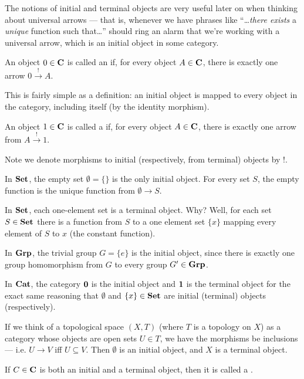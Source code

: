
The notions of initial and terminal objects are very useful later
on when thinking about universal arrows --- that is, whenever we
have phrases like ``\ldots\emph{there exists} a \emph{unique}
function such that\ldots'' should ring an alarm that we're
working with a universal arrow, which is an initial object in
some category.

\begin{defn}%
An object $0\in\mathbf{C}$ is called an  if, for every
object $A\in\mathbf{C}$, there is exactly one arrow $0\xrightarrow{\;\;!\;\;}A$.
\end{defn}

This is fairly simple as a definition: an initial object is
mapped to every object in the category, including itself (by the
identity morphism).

\begin{defn}%
An object $1\in\mathbf{C}$ is called a  if, for every
object $A\in\mathbf{C}$, there is exactly one arrow from $A\xrightarrow{\;\;!\;\;}1$.
\end{defn}

Note we denote morphisms to initial (respectively, from terminal)
objects by $!$.


\begin{ex}
In $\mathbf{Set}$, the empty set $\emptyset=\{\}$ is the only initial
object. For every set $S$, the empty function is the unique
function from $\emptyset\to S$.

In $\mathbf{Set}$, each one-element set is a terminal object. Why?
Well, for each set $S\in\mathbf{Set}$ there is a function from $S$ to
a one element set $\{x\}$ mapping every element of $S$ to $x$
(the constant function).
\end{ex}

\begin{ex}
In $\mathbf{Grp}$, the trivial group $G=\{e\}$ is the initial object,
since there is exactly one group homomorphism from $G$ to every
group $G'\in\mathbf{Grp}$. 
\end{ex}

\begin{ex}
In $\mathbf{Cat}$, the category $\mathbf{0}$ is the initial object and
$\mathbf{1}$ is the terminal object for the exact same reasoning that
$\emptyset$ and $\{x\}\in\mathbf{Set}$ are initial (terminal) objects
(respectively).  
\end{ex}

\begin{ex}
If we think of a topological space $(X,T)$ (where $T$ is a
topology on $X$) as a category whose objects are open sets
$U\in{}T$, we have the morphisms be inclusions --- i.e. $U\to{}V$
iff $U\subseteq{}V$. Then $\emptyset$ is an initial object, and
$X$ is a terminal object.
\end{ex}

\begin{defn}%
If $C\in\mathbf{C}$ is both an initial and a terminal object, then it
is called a .
\end{defn}
